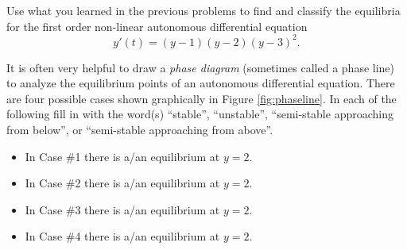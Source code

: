\begin{problem}
    Use what you learned in the previous problems to find and classify the equilibria for the
    first order non-linear autonomous differential equation
    \[ y'(t) = (y-1)(y-2)(y-3)^2. \]
\end{problem}

\newpage

\begin{technique}
    It is often very helpful to draw a {\it phase diagram} (sometimes called a phase line)
    to analyze the equilibrium points of an autonomous differential equation.  There are
    four possible cases shown graphically in Figure \ref{fig:phaseline}.  In each of the
    following fill in with the word(s) ``stable'', ``unstable'', ``semi-stable approaching
    from below'', or ``semi-stable approaching from above''.
    \begin{itemize}
        \item In Case \#1 there is a/an \underline{\hspace{1.5in}} equilibrium at $y=2$.
        \item In Case \#2 there is a/an \underline{\hspace{1.5in}} equilibrium at $y=2$.
        \item In Case \#3 there is a/an \underline{\hspace{1.5in}} equilibrium at $y=2$.
        \item In Case \#4 there is a/an \underline{\hspace{1.5in}} equilibrium at $y=2$.
    \end{itemize}
\end{technique}

